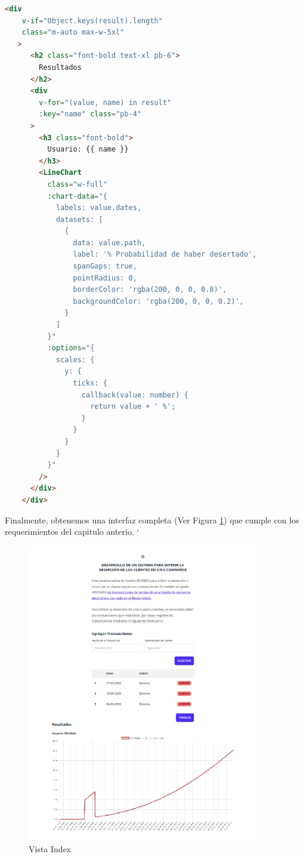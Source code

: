 \begin{lstlisting}[language=HTML, caption=crear gráfico en index.vue]
   <div 
   	v-if="Object.keys(result).length"
   	class="m-auto max-w-5xl"
   >
      <h2 class="font-bold text-xl pb-6">
        Resultados
      </h2>
      <div 
      	v-for="(value, name) in result" 
      	:key="name" class="pb-4"
      >
        <h3 class="font-bold">
          Usuario: {{ name }}
        </h3>
        <LineChart
          class="w-full"
          :chart-data="{
            labels: value.dates,
            datasets: [
              {
                data: value.path,
                label: '% Probabilidad de haber desertado',
                spanGaps: true,
                pointRadius: 0,
                borderColor: 'rgba(200, 0, 0, 0.8)',
                backgroundColor: 'rgba(200, 0, 0, 0.2)',
              }
            ]
          }"
          :options="{
            scales: {
              y: {
                ticks: {
                  callback(value: number) {
                    return value + ' %';
                  }
                }
              }
            }
          }"
        />
      </div>
    </div>
\end{lstlisting}	

Finalmente, obtenemos una interfaz completa (Ver Figura \ref{fig:ui_end}) que cumple con los requerimientos del capitulo anterio.
`
\begin{figure}[H]
	\centering \includegraphics[width=0.90\textwidth]{images/2.png}
	\caption{Vista Index}
	\label{fig:ui_end}
\end{figure}

